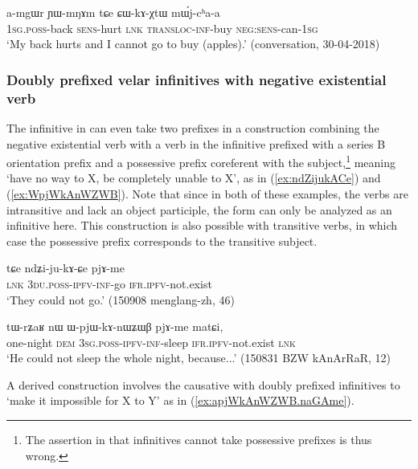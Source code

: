 \begin{exe}
\ex \label{ex:CWkAXtW}
\gll a-mgɯr ɲɯ-mŋɤm tɕe ɕɯ-kɤ-χtɯ mɯ́j-cʰa-a \\
\textsc{1sg}.\textsc{poss}-back \textsc{sens}-hurt \textsc{lnk} \textsc{transloc}-\textsc{inf}-buy \textsc{neg}:\textsc{sens}-can-\textsc{1sg} \\
\glt `My back hurts and I cannot go to  buy (apples).' (conversation, 30-04-2018)
\end{exe}

\subsubsection{Doubly prefixed velar infinitives with negative existential verb}
The infinitive in  can even take two prefixes in a construction combining the negative existential verb  with a verb in the infinitive prefixed with a series B orientation prefix and a possessive prefix coreferent with the subject,\footnote{The assertion in \citet[228]{jacques16complementation} that infinitives cannot take possessive prefixes is thus wrong.} meaning `have no way to X, be completely unable to X', as in (\ref{ex:ndZijukACe}) and (\ref{ex:WpjWkAnWZWB}). Note that since in both of these examples, the verbs are intransitive and lack an object participle, the  form can only be analyzed as an infinitive here. This construction is also possible with transitive verbs, in which case the possessive prefix corresponds to the transitive subject.

\begin{exe}
\ex \label{ex:ndZijukACe}
\gll tɕe ndʑi-ju-kɤ-ɕe pjɤ-me \\
\textsc{lnk} \textsc{3du}.\textsc{poss}-\textsc{ipfv}-\textsc{inf}-go \textsc{ifr}.\textsc{ipfv}-not.exist \\
\glt `They could not go.' (150908 menglang-zh, 46)
\end{exe}

\begin{exe}
\ex \label{ex:WpjWkAnWZWB}
\gll tɯ-rʑaʁ nɯ ɯ-pjɯ-kɤ-nɯʑɯβ pjɤ-me matɕi, \\
one-night \textsc{dem} \textsc{3sg}.\textsc{poss}-\textsc{ipfv}-\textsc{inf}-sleep \textsc{ifr}.\textsc{ipfv}-not.exist \textsc{lnk} \\
\glt `He could not sleep the whole night, because...' (150831 BZW kAnArRaR, 12)
\end{exe}

A derived construction involves the causative  with doubly prefixed infinitives to `make it impossible for X to Y' as in (\ref{ex:apjWkAnWZWB.naGAme}).

